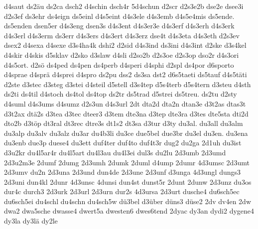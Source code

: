{    d4saut
    ds2äu
    ds2ca
    dsch2
    d4schin
    dsch4r
    5d4schun
    d2scr
    d2s3e2b
    dse2e
    dsee3i
    d2s3ef
    ds3ehr
    ds4eign
    ds5einl
    d4s5eint
    d4s3ele
    d4s3emb
    d4s5e4mis
    ds5ende.
    ds5enden
    dsen5er
    d4s3eng
    dsen3s
    d4s3ent
    d4s3er3e
    d4s3erf
    d4s3erh
    d4s3erk
    d4s3erl
    d4s3erm
    ds3err
    d4s3ers
    d4s3ert
    d4s3erz
    dse4t
    d4s3eta
    d4s3eth
    d2s3ev
    dsex2
    d4sexa
    d4sexe
    d3s4ha4k
    dshi2
    d2sid
    d4s3ind
    ds3ini
    d4s3int
    d2ske
    d3s4kel
    d4skir
    d4skis
    d5sklav
    d2sko
    d3slaw
    d4sli
    d2so2b
    d2s3oe
    d2s3op
    dso2r
    d4s3ori
    d4s5ort.
    d2sö
    ds4ped
    ds4pen
    ds4perb
    d4speri
    d4sphi
    d2spl
    ds4por
    d6sporto
    d4sprae
    d4sprä
    d4sprei
    d4spro
    ds2pu
    dss2
    ds3sa
    dst2
    d6s5taeti
    ds5tauf
    d4s5täti
    d2ste
    d3stec
    d3steg
    d3stei
    d4steil
    d5stell
    d3s4tep
    d5s4terb
    d5s4tern
    d3steu
    d4sth
    ds2ti
    ds4til
    d4stoch
    ds4tol
    ds4top
    ds2tr
    ds5trad
    d5strei
    ds5treu.
    ds2tu
    d2sty
    d4suml
    d4s3ums
    d4sumz
    d2s3un
    d4s3url
    2dt
    dta2d
    dta2n
    dtan3e
    d3t2as
    dtas3t
    d3t2ax
    dtä2s
    d3tea
    d3tec
    dteer3
    d3tem
    dte3na
    d3tep
    dte3ra
    d3tes
    dte5sta
    dti2d
    dto2b
    d3töp
    dt3ral
    dt3rec
    dtre3s
    dt1s2
    dt3sa
    d3tur
    d3ty
    du3al.
    du3all
    du3alm
    du3alp
    du3alv
    du3alz
    du3ar
    du4b3li
    du3ce
    due5bel
    due3br
    du3el
    du3en.
    du3ena
    du3enb
    due3p
    duese4
    du3ett
    duf4ter
    duf4to
    duf4t3r
    dug2
    du2ga
    2d1uh
    du3ist
    d3u2kr
    du4l5ar4r
    du4l5art
    du4l3au
    du4l3ei
    dul3s
    du2lu
    2d3umb
    2d3umd
    2d3u2m3e
    2dumf
    2dumg
    2d3umh
    2dumk
    2duml
    d4ump
    2dumr
    4d3umsc
    2d3umt
    2d3umv
    du2n
    2d3una
    2d3und
    dun4de
    2d3une
    2d3unf
    d3unga
    4d3ungl
    dungs3
    2d3uni
    dun4kl
    2dunr
    4d3unsc
    4dunsi
    dun4st
    dunst5r
    2dunt
    2dunw
    2d3unz
    du3os
    dur4c
    durch3
    2d3urk
    2d3url
    2d3urn
    dur2s
    4d3ursa
    2d3urt
    dusche4
    du6sch5ec
    du6sch5ei
    du4schl
    du4schn
    du4sch5w
    dü3bel
    d3über
    düns3
    düse2
    2dv
    dv4en
    2dw
    dwa2
    dwa5sche
    dwasse4
    dwert5a
    dwesten6
    dwes6tend
    2dyac
    dy3an
    dydi2
    dygene4
    dy3la
    dy3lä
    dy2le
}
